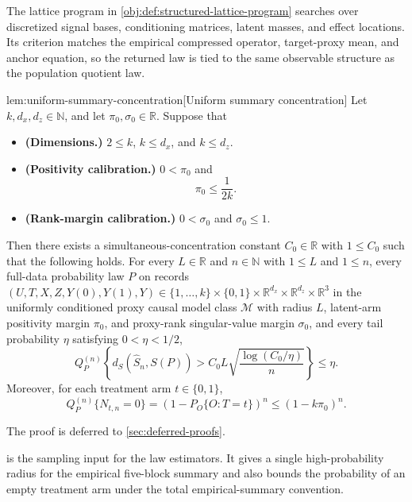\documentclass[11pt]{article}
\begin{document}
The lattice program in \cref{obj:def:structured-lattice-program} searches over discretized signal bases, conditioning matrices, latent masses, and effect locations. Its criterion matches the empirical compressed operator, target-proxy mean, and anchor equation, so the returned law is tied to the same observable structure as the population quotient law.

\begin{lemmav}{lem:uniform-summary-concentration}[Uniform summary concentration]
Let \(k,d_x,d_z\in\mathbb N\), and let \(\pi_0,\sigma_0\in\mathbb R\). Suppose that
\begin{itemize}
\item \textbf{(Dimensions.)} \(2\le k\), \(k\le d_x\), and \(k\le d_z\).
\item \textbf{(Positivity calibration.)} \(0<\pi_0\) and
\[
\pi_0\le \frac{1}{2k}.
\]
\item \textbf{(Rank-margin calibration.)} \(0<\sigma_0\) and \(\sigma_0\le 1\).
\end{itemize}
Then there exists a simultaneous-concentration constant \(C_0\in\mathbb R\) with \(1\le C_0\) such that the following holds. For every \(L\in\mathbb R\) and \(n\in\mathbb N\) with \(1\le L\) and \(1\le n\), every full-data probability law \(P\) on records \((U,T,X,Z,Y(0),Y(1),Y)\in \{1,\ldots,k\}\times\{0,1\}\times\mathbb R^{d_x}\times\mathbb R^{d_z}\times\mathbb R^3\) in the uniformly conditioned proxy causal model class \(\mathcal M\) with radius \(L\), latent-arm positivity margin \(\pi_0\), and proxy-rank singular-value margin \(\sigma_0\), and every tail probability \(\eta\) satisfying \(0<\eta<1/2\),
\[
Q_P^{(n)}\left\{d_S(\widehat S_n,S(P))>
C_0L\sqrt{\frac{\log(C_0/\eta)}{n}}\right\}\le \eta .
\]
Moreover, for each treatment arm \(t\in\{0,1\}\),
\[
Q_P^{(n)}\{N_{t,n}=0\}
=
\left(1-P_O\{O:T=t\}\right)^n
\le
(1-k\pi_0)^n .
\]
\end{lemmav}

The proof is deferred to \cref{sec:deferred-proofs}.

 is the sampling input for the law estimators. It gives a single high-probability radius for the empirical five-block summary and also bounds the probability of an empty treatment arm under the total empirical-summary convention.
\end{document}
